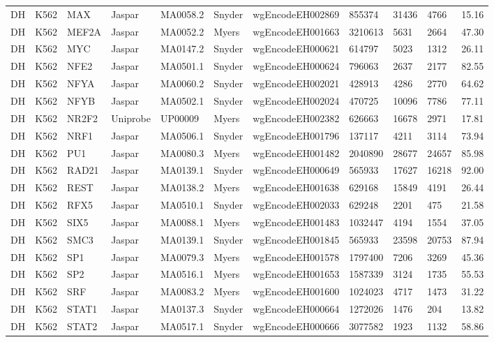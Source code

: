 {\begin{longtable}{p{0.2cm}p{1.1cm}p{1.0cm}p{1.0cm}p{1.0cm}p{1.0cm}p{2.3cm}p{1.0cm}p{0.8cm}p{0.8cm}p{0.8cm}}
DH & K562 & MAX & Jaspar & MA0058.2 & Snyder & wgEncodeEH002869 & 855374 & 31436 & 4766 & 15.16\\
DH & K562 & MEF2A & Jaspar & MA0052.2 & Myers & wgEncodeEH001663 & 3210613 & 5631 & 2664 & 47.30\\
DH & K562 & MYC & Jaspar & MA0147.2 & Snyder & wgEncodeEH000621 & 614797 & 5023 & 1312 & 26.11\\
DH & K562 & NFE2 & Jaspar & MA0501.1 & Snyder & wgEncodeEH000624 & 796063 & 2637 & 2177 & 82.55\\
DH & K562 & NFYA & Jaspar & MA0060.2 & Snyder & wgEncodeEH002021 & 428913 & 4286 & 2770 & 64.62\\
DH & K562 & NFYB & Jaspar & MA0502.1 & Snyder & wgEncodeEH002024 & 470725 & 10096 & 7786 & 77.11\\
DH & K562 & NR2F2 & Uniprobe & UP00009 & Myers & wgEncodeEH002382 & 626663 & 16678 & 2971 & 17.81\\
DH & K562 & NRF1 & Jaspar & MA0506.1 & Snyder & wgEncodeEH001796 & 137117 & 4211 & 3114 & 73.94\\
DH & K562 & PU1 & Jaspar & MA0080.3 & Myers & wgEncodeEH001482 & 2040890 & 28677 & 24657 & 85.98\\
DH & K562 & RAD21 & Jaspar & MA0139.1 & Snyder & wgEncodeEH000649 & 565933 & 17627 & 16218 & 92.00\\
DH & K562 & REST & Jaspar & MA0138.2 & Myers & wgEncodeEH001638 & 629168 & 15849 & 4191 & 26.44\\
DH & K562 & RFX5 & Jaspar & MA0510.1 & Snyder & wgEncodeEH002033 & 629248 & 2201 & 475 & 21.58\\
DH & K562 & SIX5 & Jaspar & MA0088.1 & Myers & wgEncodeEH001483 & 1032447 & 4194 & 1554 & 37.05\\
DH & K562 & SMC3 & Jaspar & MA0139.1 & Snyder & wgEncodeEH001845 & 565933 & 23598 & 20753 & 87.94\\
DH & K562 & SP1 & Jaspar & MA0079.3 & Myers & wgEncodeEH001578 & 1797400 & 7206 & 3269 & 45.36\\
DH & K562 & SP2 & Jaspar & MA0516.1 & Myers & wgEncodeEH001653 & 1587339 & 3124 & 1735 & 55.53\\
DH & K562 & SRF & Jaspar & MA0083.2 & Myers & wgEncodeEH001600 & 1024023 & 4717 & 1473 & 31.22\\
DH & K562 & STAT1 & Jaspar & MA0137.3 & Snyder & wgEncodeEH000664 & 1272026 & 1476 & 204 & 13.82\\
DH & K562 & STAT2 & Jaspar & MA0517.1 & Snyder & wgEncodeEH000666 & 3077582 & 1923 & 1132 & 58.86\\

\end{longtable}}
